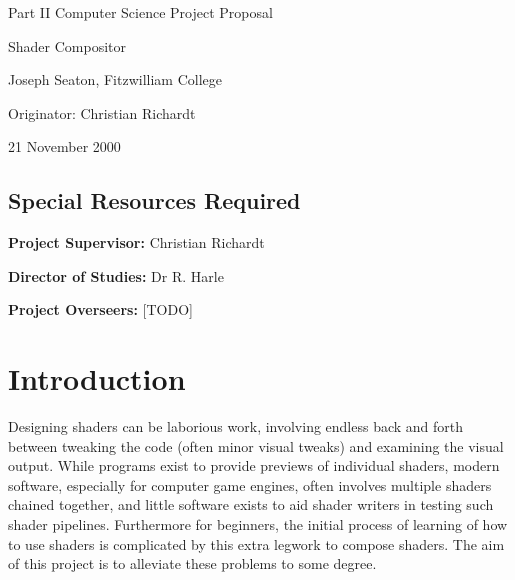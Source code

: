 

\vfil

\centerline{\Large Part II Computer Science Project Proposal}
\vspace{0.4in}
\centerline{\Large Shader Compositor }
\vspace{0.4in}
\centerline{\large Joseph Seaton, Fitzwilliam College}
\vspace{0.3in}
\centerline{\large Originator: Christian Richardt}
\vspace{0.3in}
\centerline{\large 21 November 2000}

\vfil

\subsection*{Special Resources Required}

\vspace{0.2in}

\noindent
{\bf Project Supervisor:} Christian Richardt
\vspace{0.2in}

\noindent
{\bf Director of Studies:} Dr R. Harle
\vspace{0.2in}
\noindent
 
\noindent
{\bf Project Overseers:} [TODO]

\vfil
\pagebreak


\section*{Introduction}
Designing shaders can be laborious work, involving endless back and forth between tweaking the
code (often minor visual tweaks) and examining the visual output. While programs exist to provide
previews of individual shaders, modern software, especially for computer game engines, often
involves multiple shaders chained together, and little software exists to aid shader writers in testing
such shader pipelines. Furthermore for beginners, the initial process of learning of how to use
shaders is complicated by this extra legwork to compose shaders. The aim of this project is to
alleviate these problems to some degree.

